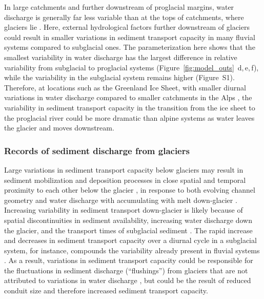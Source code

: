 \documentclass[11pt]{article}
\begin{document}
\begin{spacing}{1}
          In large catchments and further downstream of proglacial margins, water discharge is generally far less variable than at the tops of catchments, where glaciers lie \citep[c.f.][]{costa2017,vanas2017,delaney2018,hasholt2018}.
          Here, external hydrological factors further downstream of glaciers could result in smaller variations in sediment transport capacity in many fluvial systems compared to subglacial ones.
          The parameterization here shows that the smallest variability in water discharge has the largest difference in relative variability from subglacial to proglacial systems (Figure~\ref{fig:model_outs}\, d,\,e,\,f), while the variability in the subglacial system remains higher (Figure~S1).
          Therefore, at locations such as the Greenland Ice Sheet, with smaller diurnal variations in water discharge compared to smaller catchments in the Alps \citep[c.f.][]{delaney2018,hasholt2018}, the variability in sediment transport capacity in the transition from the ice sheet to the proglacial river could be more dramatic than alpine systems as water leaves the glacier and moves downstream.
        
          
          \subsubsection{Records of sediment discharge  from glaciers}
        
          Large variations in sediment transport capacity below glaciers may result in sediment mobilization and deposition processes in close spatial and temporal proximity to each other below the glacier \citep{gimbert2016,perolo2018}, in response to both evolving channel geometry and water discharge with accumulating with melt down-glacier \citep{beaud2018,delaney2019}.
          Increasing variability in sediment transport down-glacier is likely because of spatial discontinuities in sediment availability, increasing water discharge down the glacier, and the transport times of subglacial sediment \citep{williams1989,delaney2019}.
          The rapid increase and decreases in sediment transport capacity over a diurnal cycle in a subglacial system, for instance, compounds the variability already present in fluvial systems \citep{williams1989,jerolmack2010}.
          As a result, variations in sediment transport capacity could be responsible for the fluctuations in sediment discharge (``flushings'') from glaciers that are not attributed to variations in water discharge \citep[e.g.][]{richards2003,swift2021}, but could be the result of reduced conduit size and therefore increased sediment transport capacity.


\end{spacing}
\end{document}
